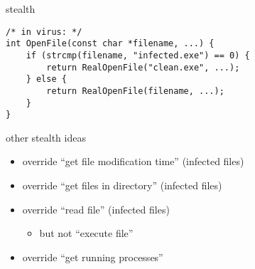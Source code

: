 
\begin{frame}[fragile,label=stealth]{stealth}
\lstset{language=C,style=small}
\begin{lstlisting}
/* in virus: */
int OpenFile(const char *filename, ...) {
    if (strcmp(filename, "infected.exe") == 0) {
        return RealOpenFile("clean.exe", ...);
    } else {
        return RealOpenFile(filename, ...);
    }
}
\end{lstlisting}
\end{frame}

\begin{frame}{other stealth ideas}
    \begin{itemize}
    \item override ``get file modification time'' (infected files)
    \item override ``get files in directory'' (infected files)
    \item override ``read file'' (infected files)
        \begin{itemize}
        \item but not ``execute file''
        \end{itemize}
    \item override ``get running processes'' 
    \end{itemize}
\end{frame}

